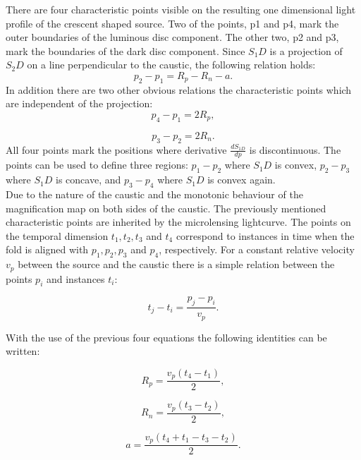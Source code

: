 There are four characteristic points visible on the resulting one dimensional light profile of the crescent shaped source. Two of the points, p1 and p4, mark the outer boundaries of the luminous disc component. The other two, p2 and p3, mark the boundaries of the dark disc component. Since $S_1D$ is a projection of $S_2D$ on a line perpendicular to the caustic, the following relation holds:
\begin{equation}
	p_2-p_1 = R_p -R_n - a.
\end{equation}
In addition there are two other obvious relations the characteristic points which are independent of the projection:
\begin{equation}
	p_4 -p_1 = 2 R_p,
\end{equation}

\begin{equation}
        p_3 -p_2 = 2 R_n.
\end{equation}
All four points mark the positions where derivative $\frac{dS_{1D}}{dp}$ is discontinuous. The points can be used to define three regions: $p_1 - p_2$ where $S_1D$ is convex, $p_2 - p_3$ where $S_1D$ is concave, and $p_3 - p_4$ where $S_1D$ is convex again. \\

Due to the nature of the caustic and the monotonic behaviour of the magnification map on both sides of the caustic. The previously mentioned characteristic points are inherited by the microlensing lightcurve. The points on the temporal dimension $t_1, t_2, t_3$ and $t_4$ correspond to instances in time when the fold is aligned with $p_1, p_2, p_3$ and $p_4$, respectively. For a constant relative velocity $v_p$ between the source and the caustic there is a simple relation between the points $p_i$ and instances $t_i$:

\begin{equation}
	t_j - t_i = \frac{p_j - p_i}{v_p}.
\end{equation}

With the use of the previous four equations the following identities can be written:

\begin{equation}
	R_p = \frac{v_p \left( t_4 -t_1 \right)}{2}, 
\end{equation}

\begin{equation}
        R_n = \frac{v_p \left( t_3 -t_2 \right)}{2}, 
\end{equation}

\begin{equation}
        a = \frac{v_p \left( t_4 +t_1 - t_3 - t_2 \right)}{2}. 
\end{equation}



